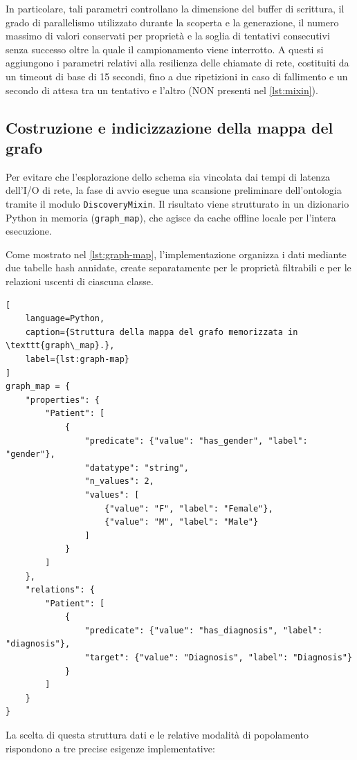 \documentclass[12pt,a4paper,openright,twoside]{book}
\begin{document}
In particolare, tali parametri controllano la dimensione del buffer di
scrittura, il grado di parallelismo utilizzato durante la scoperta e la
generazione, il numero massimo di valori conservati per proprietà e la soglia di
tentativi consecutivi senza successo oltre la quale il campionamento viene
interrotto. A questi si aggiungono i parametri relativi alla resilienza delle
chiamate di rete, costituiti da un timeout di base di 15 secondi, fino a due
ripetizioni in caso di fallimento e un secondo di attesa tra un tentativo e
l'altro (NON presenti nel \cref{lst:mixin}).

\subsection{Costruzione e indicizzazione della mappa del grafo}
\label{sec:impl-discovery}

Per evitare che l'esplorazione dello schema sia vincolata dai tempi di latenza
dell'I/O di rete, la fase di avvio esegue una scansione preliminare
dell'ontologia tramite il modulo \texttt{DiscoveryMixin}. Il risultato viene
strutturato in un dizionario Python in memoria (\texttt{graph\_map}), che agisce
da cache offline locale per l'intera esecuzione.

Come mostrato nel \cref{lst:graph-map}, l'implementazione organizza i dati
mediante due tabelle hash annidate, create separatamente per le proprietà
filtrabili e per le relazioni uscenti di ciascuna classe.

\begin{lstlisting}[
    language=Python,
    caption={Struttura della mappa del grafo memorizzata in \texttt{graph\_map}.},
    label={lst:graph-map}
]
graph_map = {
    "properties": {
        "Patient": [
            {
                "predicate": {"value": "has_gender", "label": "gender"},
                "datatype": "string",
                "n_values": 2,
                "values": [
                    {"value": "F", "label": "Female"},
                    {"value": "M", "label": "Male"}
                ]
            }
        ]
    },
    "relations": {
        "Patient": [
            {
                "predicate": {"value": "has_diagnosis", "label": "diagnosis"},
                "target": {"value": "Diagnosis", "label": "Diagnosis"}
            }
        ]
    }
}
\end{lstlisting}

La scelta di questa struttura dati e le relative modalità di popolamento
rispondono a tre precise esigenze implementative:
\end{document}
